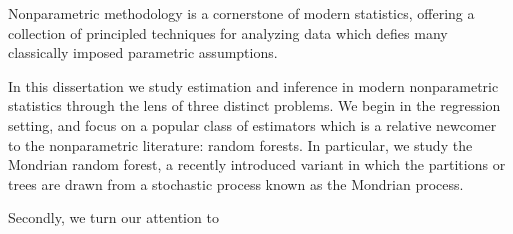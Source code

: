 

Nonparametric methodology is a cornerstone of modern statistics,
offering a collection of principled techniques for analyzing data
which defies many classically imposed parametric assumptions.



In this dissertation we study estimation and inference in modern nonparametric
statistics through the lens of three distinct problems.
%
We begin in the regression setting, and focus on a
popular class of estimators which is a relative newcomer to
the nonparametric literature: random forests.
In particular, we study the Mondrian random forest, a
recently introduced variant in which the partitions or trees are
drawn from a stochastic process known as the Mondrian process.

Secondly, we turn our attention to


